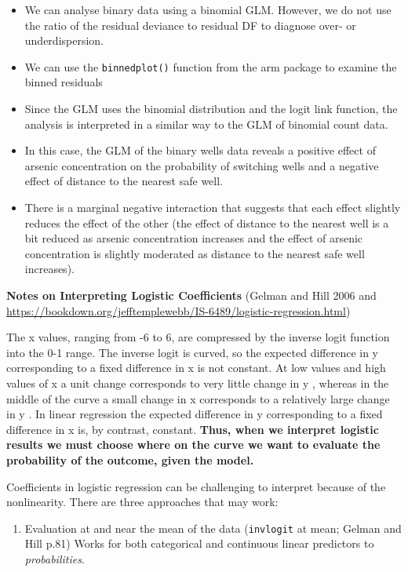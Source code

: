 \documentclass[
]{article}
\providecommand{\tightlist}{%
  \setlength{\itemsep}{0pt}\setlength{\parskip}{0pt}}
\begin{document}
\begin{itemize}
\item
  We can analyse binary data using a binomial GLM. However, we do not
  use the ratio of the residual deviance to residual DF to diagnose
  over- or underdispersion.
\item
  We can use the \texttt{binnedplot()} function from the arm package to
  examine the binned residuals
\item
  Since the GLM uses the binomial distribution and the logit link
  function, the analysis is interpreted in a similar way to the GLM of
  binomial count data.
\item
  In this case, the GLM of the binary wells data reveals a positive
  effect of arsenic concentration on the probability of switching wells
  and a negative effect of distance to the nearest safe well.
\item
  There is a marginal negative interaction that suggests that each
  effect slightly reduces the effect of the other (the effect of
  distance to the nearest well is a bit reduced as arsenic concentration
  increases and the effect of arsenic concentration is slightly
  moderated as distance to the nearest safe well increases).
\end{itemize}

\textbf{Notes on Interpreting Logistic Coefficients} (Gelman and Hill
2006 and
\url{https://bookdown.org/jefftemplewebb/IS-6489/logistic-regression.html})

The x values, ranging from -6 to 6, are compressed by the inverse logit
function into the 0-1 range. The inverse logit is curved, so the
expected difference in y corresponding to a fixed difference in x is not
constant. At low values and high values of x a unit change corresponds
to very little change in y , whereas in the middle of the curve a small
change in x corresponds to a relatively large change in y . In linear
regression the expected difference in y corresponding to a fixed
difference in x is, by contrast, constant. \textbf{Thus, when we
interpret logistic results we must choose where on the curve we want to
evaluate the probability of the outcome, given the model.}

Coefficients in logistic regression can be challenging to interpret
because of the nonlinearity. There are three approaches that may work:

\begin{enumerate}
\def\labelenumi{\arabic{enumi}.}
\tightlist
\item
  Evaluation at and near the mean of the data (\texttt{invlogit} at
  mean; Gelman and Hill p.81) Works for both categorical and continuous
  linear predictors to \emph{probabilities}.
\end{enumerate}
\end{document}

